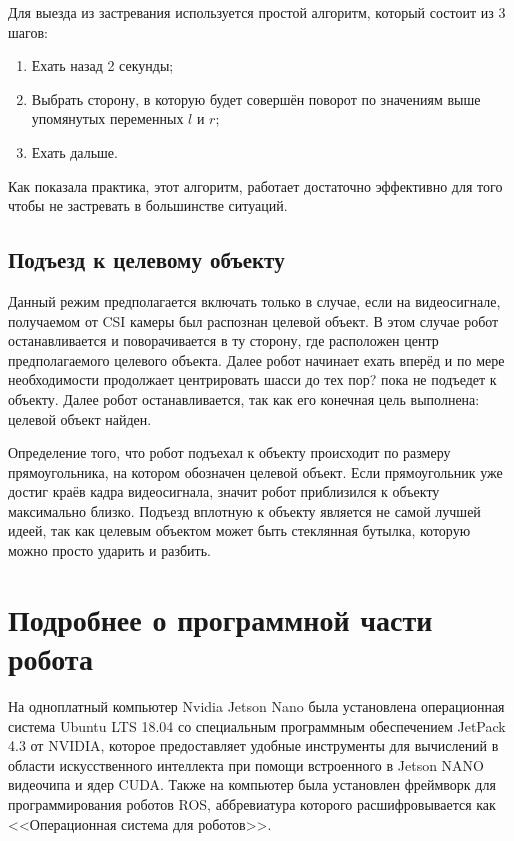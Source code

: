 Для выезда из застревания используется простой алгоритм, который состоит из 3 шагов:

\begin{enumerate}
\item Ехать назад 2 секунды;
\item Выбрать сторону, в которую будет совершён поворот по значениям выше упомянутых переменных $l$ и $r$;
\item Ехать дальше.
\end{enumerate}

Как показала практика, этот алгоритм, работает достаточно эффективно для того чтобы не застревать в большинстве ситуаций.

\subsection{Подъезд к целевому объекту}

Данный режим предполагается включать только в случае, если на видеосигнале, получаемом от CSI камеры был распознан целевой объект. В этом случае робот останавливается и поворачивается в ту сторону, где расположен центр предполагаемого целевого объекта. Далее робот начинает ехать вперёд и по мере необходимости продолжает центрировать шасси до тех пор? пока не подъедет к объекту. Далее робот останавливается, так как его конечная цель выполнена: целевой объект найден. 

Определение того, что робот подъехал к объекту происходит по размеру прямоугольника, на котором обозначен целевой объект. Если прямоугольник уже достиг краёв кадра видеосигнала, значит робот приблизился к объекту максимально близко. Подъезд вплотную к объекту является не самой лучшей идеей, так как целевым объектом может быть стеклянная бутылка, которую можно просто ударить и разбить.

\section{Подробнее о программной части робота}
На одноплатный компьютер Nvidia Jetson Nano была установлена операционная система Ubuntu LTS 18.04 со специальным программным обеспечением JetPack 4.3 от NVIDIA, которое предоставляет удобные инструменты для вычислений в области искусственного интеллекта при помощи встроенного в Jetson NANO видеочипа и ядер CUDA. Также на компьютер была установлен фреймворк для программирования роботов ROS, аббревиатура которого расшифровывается как <<Операционная система для роботов>>.

